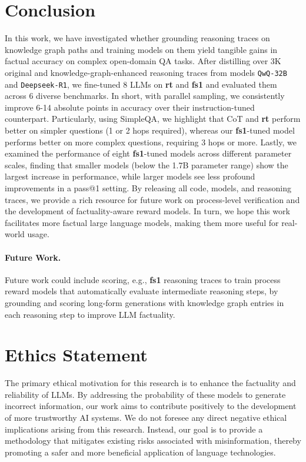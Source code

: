 \documentclass[11pt]{article}
\newcommand{\rone}{\texttt{Deepseek-R1}}
\newcommand{\qwq}{\texttt{QwQ-32B}}
\newcommand{\dataset}{\textbf{fs1}}
\newcommand{\datasetrt}{\textbf{\textbf{rt}}}
\begin{document}
\section{Conclusion}\label{conclusion}
In this work, we have investigated whether grounding reasoning traces on knowledge graph paths and training models on them yield tangible gains in factual accuracy on complex open-domain QA tasks. 
After distilling over 3K original and knowledge-graph-enhanced reasoning traces from models \qwq{} and \rone{}, we fine-tuned 8 LLMs on \datasetrt{} and \dataset{} and evaluated them across 6 diverse benchmarks. 
In short, with parallel sampling, we consistently improve 6-14 absolute points in accuracy over their instruction-tuned counterpart. 
Particularly, using SimpleQA, we highlight that CoT and \datasetrt{} perform better on simpler questions (1 or 2 hops required), whereas our \dataset{}-tuned model performs better on more complex questions, requiring 3 hops or more. 
Lastly, we examined the performance of eight \dataset{}-tuned models across different parameter scales, finding that smaller models (below the 1.7B parameter range) show the largest increase in performance, while larger models see less profound improvements in a pass@1 setting. 
By releasing all code, models, and reasoning traces, we provide a rich resource for future work on process-level verification and the development of factuality-aware reward models. 
In turn, we hope this work facilitates more factual large language models, making them more useful for real-world usage.

\paragraph{Future Work.}
Future work could include scoring, e.g., \dataset{} reasoning traces to train process reward models that automatically evaluate intermediate reasoning steps, by grounding and scoring long-form generations with knowledge graph entries in each reasoning step to improve LLM factuality.

\section*{Ethics Statement}
The primary ethical motivation for this research is to enhance the factuality and reliability of LLMs. By addressing the probability of these models to generate incorrect information, our work aims to contribute positively to the development of more trustworthy AI systems. We do not foresee any direct negative ethical implications arising from this research. Instead, our goal is to provide a methodology that mitigates existing risks associated with misinformation, thereby promoting a safer and more beneficial application of language technologies.
\end{document}
